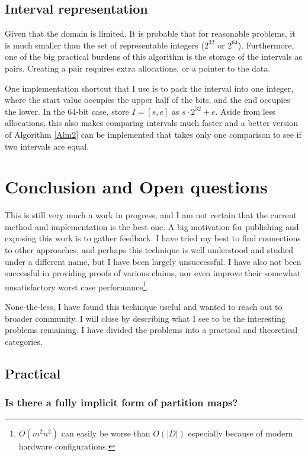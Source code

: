 \documentclass{article}
\begin{document}
\subsection{Interval representation}

Given that the domain is limited.
It is probable that for reasonable problems,
it is much smaller than the set of representable integers ($2^{32}$ or $2^64$).
Furthermore,
one of the big practical burdens of this algorithm is the storage of the intervals
as pairs.
Creating a pair requires extra allocations, or a pointer to the data.

One implementation shortcut that I use is to pack the interval into one integer,
where the start value occupies the upper half of the bits,
and the end occupies the lower.
In the 64-bit case, store $I = [s,e]$ as  $s \cdot 2^{32}+e$.
Aside from less allocations,
this also makes comparing intervals much faster
and a better version of Algorithm \ref{Alm2} can be implemented that
takes only one comparison to see if two intervals are equal.

\section{Conclusion and Open questions}

This is still very much a work in progress,
and I am not certain that the current method and implementation is the best one.
A big motivation for publishing and exposing this work is to gather feedback.
I have tried my best to find connections to other approaches,
and perhaps this technique is well understood and studied under a different name,
but I have been largely unsuccessful.
I have also not been successful in providing proofs of various claims,
nor even improve their somewhat unsatisfactory worst case
performance\footnote{$O(m^{2}n^{2})$ can easily be worse than $O(|D|)$ especially because
of modern hardware configurations.}.

None-the-less, I have found this technique useful and wanted to reach out to
broader community.
I will close by describing what I see to be the interesting problems remaining.
I have divided the problems into a practical and theoretical categories.

\subsection{Practical}
\subsubsection{Is there a fully implicit form of partition maps?}
\end{document}

